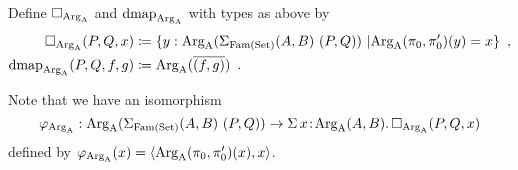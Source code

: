 \documentclass[orivec,envcountsame, ,envcountsect]{llncs}
\begin{document}
\begin{definition}
Define $\Box_{\text{Arg}_{\text{A}}}$ and $\text{dmap}_{\text{Arg}_{\text{A}}}$ with types as above by
\begin{align*}
\BOX_{\ArgA}(P, Q, x) &\coloneqq %
    \{ y : \ArgA(\SigmaFAM (A, B)\ (P, Q))\ | \ArgA(\pi_0, \pi'_0)(y) = x\} \enspace , \\
\dmap_{\ArgA}(P, Q, f, g) &\coloneqq %
    \ArgA(\CwFsect{(f, g)}) \enspace .
\end{align*}
\end{definition}


\noindent Note that we have an isomorphism
\[
\varphi_{\text{Arg}_{\text{A}}} : \text{Arg}_{\text{A}}(\Sigma_{\text{Fam}(\text{Set})} (A, B)\ (P, Q)) \to \Sigma\,x\!:\! \text{Arg}_{\text{A}}(A, B) .\, \Box_{\text{Arg}_{\text{A}}}(P, Q, x)
\]
defined by $\varphi_{\text{Arg}_{\text{A}}}(x) = \langle \text{Arg}_{\text{A}}(\pi_0, \pi'_0)(x), x\rangle$.
\end{document}
